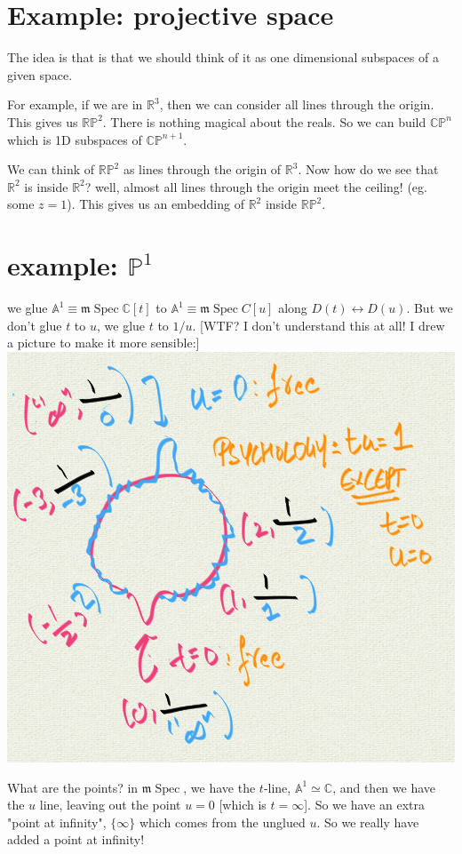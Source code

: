 \documentclass{book}
\newcommand{\C}{\ensuremath{\mathbb{C}}}
\newcommand{\R}{\ensuremath{\mathbb{R}}}
\newcommand{\CP}{\ensuremath{\mathbb{CP}}}
\renewcommand{\P}{\ensuremath{\mathbb{P}}}
\newcommand{\A}{\ensuremath{\mathbb{A}}}
\newcommand{\RP}{\ensuremath{\mathbb{RP}}}
\newcommand{\m}{\mathfrak{m}}
\newcommand{\mSpec}{\m\operatorname{Spec}}
\newcommand{\mspec}{\m\operatorname{Spec}}
\theoremstyle{definition}
\begin{document}
\section{Example: projective space}
The idea is that is that we should think of it as one dimensional subspaces
of a given space.

For example, if we are in $\R^3$, then we can consider all lines through
the origin. This gives us $\RP^2$. There is nothing magical about the reals.
So we can build $\CP^n$ which is 1D subspaces of $\CP^{n+1}$.

We can think of $\RP^2$ as lines through the origin of $\R^3$. Now how do
we see that $\R^2$ is inside $\R^2$? well, almost all lines through the
origin meet the ceiling! (eg. some $z = 1$). This gives us an embedding
of $\R^2$ inside $\RP^2$.

\section{example: $\P^1$}

we glue $\A^1 \equiv \mSpec \C[t]$ to $\A^1 \equiv \mSpec C[u]$ along
$D(t) \leftrightarrow D(u)$. But we don't glue $t$ to $u$, we glue $t$ to $1/u$.
[WTF? I don't understand this at all! I drew a picture to make it more
sensible:]
\includegraphics{projective-space-glued.png}


What are the points? in $\mspec$, we have the $t$-line, $\A^1 \simeq \C$,
and then we have the $u$ line, leaving out the point $u = 0$ [which is $t = \infty$].
So we have an extra "point at infinity", $\{ \infty \}$ which comes from
the unglued $u$. So we really have added a point at infinity!
\end{document}
